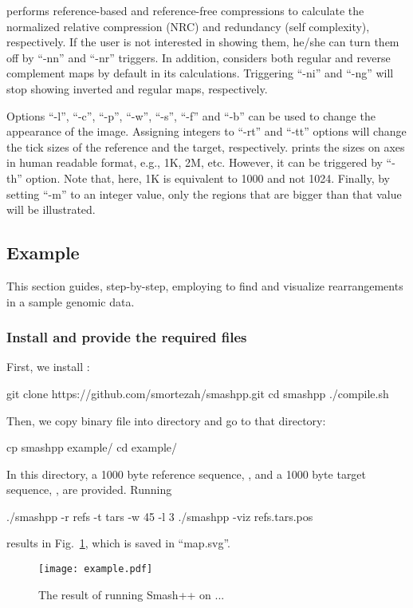 \smashpp performs reference-based and reference-free compressions to calculate the normalized relative compression (NRC) and redundancy (self complexity), respectively. If the user is not interested in showing them, he/she can turn them off by ``-nn'' and ``-nr'' triggers. In addition, \smashpp considers both regular and reverse complement maps by default in its calculations. Triggering ``-ni'' and ``-ng'' will stop showing inverted and regular maps, respectively.

Options ``-l'', ``-c'', ``-p'', ``-w'', ``-s'', ``-f'' and ``-b'' can be used to change the appearance of the image. Assigning integers to ``-rt'' and ``-tt'' options will change the tick sizes of the reference and the target, respectively. \smashpp prints the sizes on axes in human readable format, e.g., 1K, 2M, etc. However, it can be triggered by ``-th'' option. Note that, here, 1K is equivalent to 1000 and not 1024. Finally, by setting ``-m'' to an integer value, only the regions that are bigger than that value will be illustrated.

\subsection{Example}
This section guides, step-by-step, employing \smashpp to find and visualize rearrangements in a sample genomic data.

\subsubsection*{Install \smashpp and provide the required files}
First, we install \smashpp:
\begin{code}[style=bash]
git clone https://github.com/smortezah/smashpp.git
cd smashpp
./compile.sh
\end{code}
Then, we copy  binary file into  directory and go to that directory:
\begin{code}[style=bash]
cp smashpp example/
cd example/
\end{code}
In this directory, a 1000 byte reference sequence, , and a 1000 byte target sequence, , are provided. Running
\begin{code}[style=bash]
./smashpp -r refs -t tars -w 45 -l 3
./smashpp -viz refs.tars.pos
\end{code}
results in Fig.~\ref{fig.example}, which is saved in ``map.svg''.

\begin{figure}[!h]
  \texttt{[image: example.pdf]}
  \caption{The result of running Smash++ on ...}
  \label{fig.example}
\end{figure}